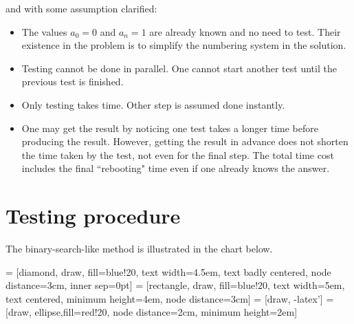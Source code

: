 \documentclass[]{article}
\begin{document}
and with some assumption clarified:
\begin{itemize}
	\item The values $a_0 = 0$ and $a_n = 1$ are already known and no need to test. Their existence in the problem is to simplify the numbering system in the solution.
	\item Testing cannot be done in parallel. One cannot start another test until the previous test is finished.
	\item Only testing takes time. Other step is assumed done instantly.
	\item One may get the result by noticing one test takes a longer time before producing the result. However, getting the result in advance does not shorten the time taken by the test, not even for the final step. The total time cost includes the final ``rebooting" time even if one already knows the answer.
\end{itemize}

\section{Testing procedure}

The binary-search-like method is illustrated in the chart below.

 = [diamond, draw, fill=blue!20, 
text width=4.5em, text badly centered, node distance=3cm, inner sep=0pt]
 = [rectangle, draw, fill=blue!20, 
text width=5em, text centered, minimum height=4em, node distance=3cm]
 = [draw, -latex']
 = [draw, ellipse,fill=red!20, node distance=2cm,
minimum height=2em]

\end{document}

